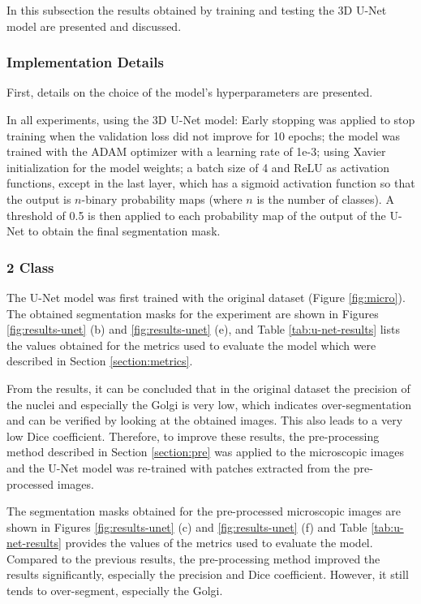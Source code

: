 In this subsection the results obtained by training and testing the \ac{3D} U-Net model are presented and discussed.

\subsubsection*{Implementation Details}

First, details on the choice of the model's hyperparameters are presented.

In all experiments, using the \ac{3D} U-Net model: Early stopping was applied to stop training when the validation loss did not improve for 10 epochs; the model was trained with the ADAM optimizer with a learning rate of 1e-3; using Xavier initialization for the model weights; a batch size of 4 and \ac{ReLU} as activation functions, except in the last layer, which has a sigmoid activation function so that the output is $n$-binary probability maps (where $n$ is the number of classes). A threshold of 0.5 is then applied to each probability map of the output of the U-Net to obtain the final segmentation mask.


\subsubsection*{2 Class}

The U-Net model was first trained with the original dataset (Figure \ref{fig:micro}). The obtained segmentation masks for the experiment are shown in Figures \ref{fig:results-unet} (b) and \ref{fig:results-unet} (e), and Table \ref{tab:u-net-results} lists the values obtained for the metrics used to evaluate the model which were described in Section \ref{section:metrics}.

From the results, it can be concluded that in the original dataset the precision of the nuclei and especially the Golgi is very low, which indicates over-segmentation and can be verified by looking at the obtained images. This also leads to a very low Dice coefficient. Therefore, to improve these results, the pre-processing method described in Section \ref{section:pre} was applied to the microscopic images and the U-Net model was re-trained with patches extracted from the pre-processed images.

The segmentation masks obtained for the pre-processed microscopic images are shown in Figures \ref{fig:results-unet} (c) and \ref{fig:results-unet} (f) and Table \ref{tab:u-net-results} provides the values of the metrics used to evaluate the model. Compared to the previous results, the pre-processing method improved the results significantly, especially the precision and Dice coefficient. However, it still tends to over-segment, especially the Golgi.

